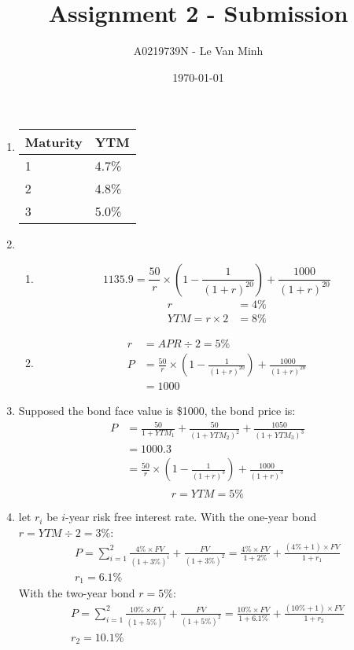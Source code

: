 \documentclass{article}
\title{Assignment 2 - Submission}
\author{A0219739N - Le Van Minh}
\date{\today}
\begin{document}
\maketitle
\begin{enumerate}[leftmargin=\labelsep]
  \item 
    \begin{tabular}{l|l}
      \hline
      \multicolumn{1}{c|}{\textbf{Maturity}} & 
      \multicolumn{1}{c}{\textbf{YTM}} \\
      \hline
      1 & 4.7\% \\
      2 & 4.8\% \\
      3 & 5.0\% \\
      \hline
    \end{tabular}
  \item \begin{enumerate}
    \item 
      \[
        1135.9 = \frac{50}{r} \times \left(1 - \frac{1}{(1+r)^{20}} \right) + \frac{1000}{(1+r)^{20}} 
      \]
      \begin{align*}
        r & = 4\% \\
        YTM = r \times 2 &= 8\%
      \end{align*}
      
    \item 
      \begin{align*}
        r & = APR \div 2 = 5\% \\
        P & = \frac{50}{r} \times \left(1 - \frac{1}{(1+r)^{20}} \right) + \frac{1000}{(1+r)^{20}} \\
        & = 1000
      \end{align*}
  \end{enumerate}

  \item Supposed the bond face value is \$1000, the bond price is:
    \begin{align*}
      P &= \frac{50}{1+YTM_1} + \frac{50}{(1+YTM_2)^2} + \frac{1050}{(1+YTM_3)^3} \\
      &= 1000.3 \\
      &= \frac{50}{r} \times \left(1 - \frac{1}{(1+r)^{3}} \right) + \frac{1000}{(1+r)^{3}} \\
    \end{align*}
    \[
      r = YTM = 5 \%
    \]

  \item let $r_i$ be $i$-year risk free interest rate. With the one-year bond $r = YTM \div 2 = 3\%$:
    \begin{gather*}
      P = \displaystyle\sum_{i=1}^{2} \frac{4\% \times FV}{(1+3\%)^i} + \frac{FV}{(1+3\%)^2} = \frac{4\% \times FV}{1 + 2\%} + \frac{(4\% + 1) \times FV}{1 + r_1} \\
      r_1 = 6.1 \%
    \end{gather*}
    With the two-year bond $r = 5\%$:
    \begin{gather*}
      P = \displaystyle\sum_{i=1}^{2} \frac{10\% \times FV}{(1+5\%)^i} + \frac{FV}{(1+5\%)^2} = \frac{10\% \times FV}{1 + 6.1\%} + \frac{(10\% + 1) \times FV}{1 + r_2} \\
      r_2 = 10.1 \%
    \end{gather*}


\end{enumerate}
\end{document}
